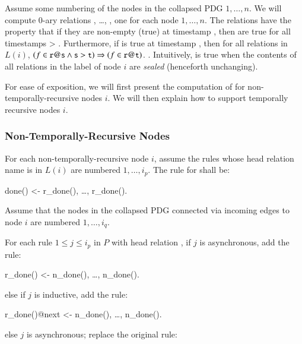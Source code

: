Assume some numbering of the nodes in the collapsed PDG $1,\ldots,n$.  We will compute 0-ary relations , \ldots, , one for each node $1,\ldots,n$.  The relations  have the property that if they are non-empty (true) at timestamp , then are true for all timestamps  > .  Furthermore, if  is true at timestamp , then for all relations  in $L(i)$, $(f \in \dedalus{r}@\dedalus{s} \land \dedalus{s} > \dedalus{t}) \Rightarrow (f \in \dedalus{r}@\dedalus{t})$. .  Intuitively,  is true when the contents of all relations in the label of node $i$ are {\em sealed} (henceforth unchanging).

For ease of exposition, we will first present the computation of  for non-temporally-recursive nodes $i$.  We will then explain how to support temporally recursive nodes $i$.

\subsubsection{Non-Temporally-Recursive Nodes}

For each non-temporally-recursive node $i$, assume the rules whose head relation name is in $L(i)$ are numbered $1, \ldots, i_p$.  The rule for  shall be:

\begin{Dedalus}
done() <- r_done(), \ldots, r_done().
\end{Dedalus}

Assume that the nodes in the collapsed PDG connected via incoming edges to node $i$ are numbered $1, \ldots, i_q$.

For each rule $1 \leq j \leq i_p$ in $P$ with head relation , if $j$ is asynchronous, add the rule:

\begin{Dedalus}
r_done() <- n_done(), \ldots, n_done().
\end{Dedalus}

else if $j$ is inductive, add the rule:

\begin{Dedalus}
r_done()@next <- n_done(), \ldots, n_done().
\end{Dedalus}

else $j$ is asynchronous; replace the original rule:

